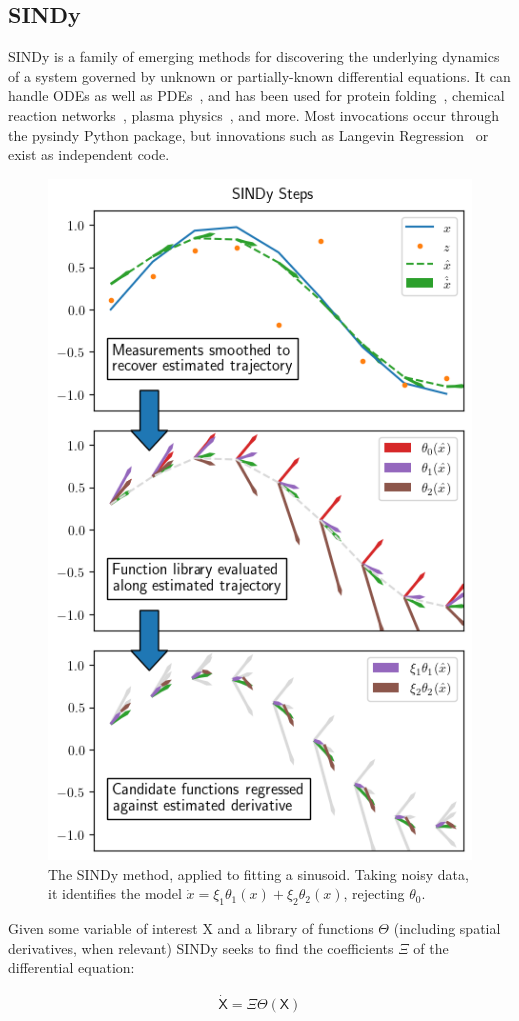 \documentclass{ACCESS_latex_template_20231118/ieeeaccess}
\newcommand{\mat}[1]{\boldsymbol{\mathsf{#1}}}
\renewcommand{\vec}[1]{\boldsymbol{\mathrm{#1}}}
\begin{document}
\subsection{SINDy}
SINDy \citep{Brunton2016} is a family of emerging methods for discovering the underlying dynamics of a system governed by unknown or partially-known \citep{Champion2020} differential equations.  It can handle ODEs as well as PDEs~\citep{Rudy2017}, and has been used for protein folding~\citep{Boninsegna2018}, chemical reaction networks~\citep{Hoffmann2019}, plasma physics~\citep{Guan2021}, and more.  Most invocations occur through the pysindy Python package, but innovations such as Langevin Regression~\citep{Callaham2021} or \cite{Rudy2019} exist as independent code.

\begin{figure}[ht]
    \label{fig:sindy}
    \centering
    \includegraphics[width=.5\textwidth]{images/explain_sindy}
    \caption{The SINDy method, applied to fitting a sinusoid.  Taking noisy data, it identifies the model $\dot x = \xi_1\theta_1(x) + \xi_2\theta_2(x)$, rejecting $\theta_0$.}
\end{figure}


Given some variable of interest $\vec X$ and a library of functions $\mat \Theta$ (including spatial derivatives, when relevant) SINDy seeks to find the coefficients $\mat \Xi$ of the differential equation:

\begin{align}
    \label{eqn:sindy_ode}
    \dot {\mat X} = \Xi {\mat\Theta}({\mat X})
\end{align}
\end{document}
